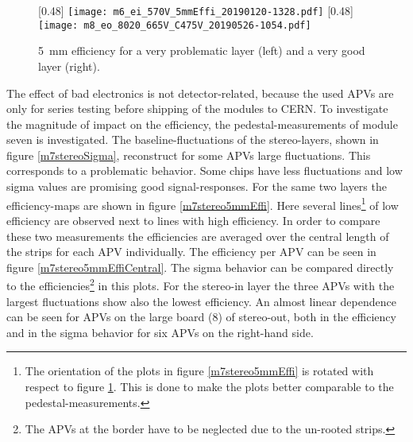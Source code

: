 \documentclass[
twoside,            %
BCOR1.4cm,          %
10pt,               %
headings=normal,    %
headsepline,        %
clearplainpage,		%
final,              %
div=14,
open=right,
bibliography=toc
]{scrreprt}
\begin{document}
\begin{figure}[!h]
	\centering
	[0.48\textwidth]
	{\texttt{[image: m6\_ei\_570V\_5mmEffi\_20190120-1328.pdf]}}
	\hfill
	[0.48\textwidth]
	{\texttt{[image: m8\_eo\_8020\_665V\_C475V\_20190526-1054.pdf]}}
	\vspace{-2mm}
	\caption{
		\SI{5}{mm} efficiency for a very problematic layer (left) and a very good layer (right).
	}
	\label{effiMaps}
\end{figure}

The effect of bad electronics is not detector-related, because the used APVs are only for series testing before shipping of the modules to CERN.
To investigate the magnitude of impact on the efficiency, the pedestal-measurements of module seven is investigated.
The baseline-fluctuations of the stereo-layers, shown in figure \ref{m7stereoSigma}, reconstruct for some APVs large fluctuations. 
This corresponds to a problematic behavior.
Some chips have less fluctuations and low sigma values are promising good signal-responses.
For the same two layers the efficiency-maps are shown in figure \ref{m7stereo5mmEffi}.
Here several lines\footnote{
	The orientation of the plots in figure \ref{m7stereo5mmEffi} is rotated with respect to figure \ref{effiMaps}. 
	This is done to make the plots better comparable to the pedestal-measurements.
} of low efficiency are observed next to lines with high efficiency.
In order to compare these two measurements the efficiencies are averaged over the central length of the strips for each APV individually.
The efficiency per APV can be seen in figure \ref{m7stereo5mmEffiCentral}.
The sigma behavior can be compared directly to the efficiencies\footnote{
	The APVs at the border have to be neglected due to the un-rooted strips.
} in this plots.
For the stereo-in layer the three APVs with the largest fluctuations show also the lowest efficiency.
An almost linear dependence can be seen for APVs on the large board (8) of stereo-out, both in the efficiency and in the sigma behavior for six APVs on the right-hand side.
\end{document}
